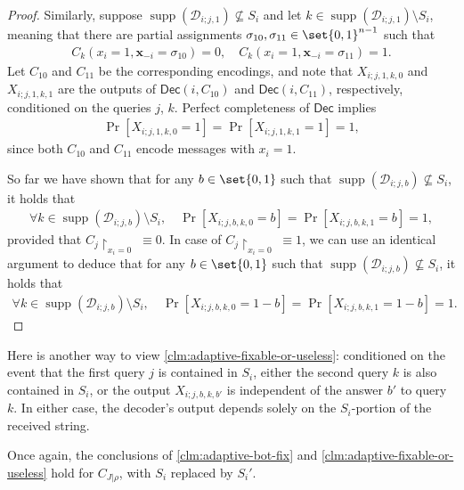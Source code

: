 \documentclass[10pt,a4paper]{article}
\theoremstyle{remark}
\def\*#1{\mathbf{#1}}
\def\+#1{\mathcal{#1}}
\newcommand{\Dec}{\ensuremath{\mathsf{Dec}}\xspace}
\providecommand{\supp}{\operatorname{supp}}
\begin{document}
\begin{proof}
Similarly, suppose $\supp(\+D_{i;j,1}) \not\subseteq S_i$ and let $k \in \supp(\+D_{i;j,1}) \setminus S_i$, meaning that there are partial assignments $\sigma_{10}, \sigma_{11} \in \set{0,1}^{n-1}$ such that
\begin{align*}
C_k(x_i=1, \*x_{-i}=\sigma_{10}) = 0, \quad C_k(x_i=1, \*x_{-i}=\sigma_{11}) = 1.
\end{align*}
Let $C_{10}$ and $C_{11}$ be the corresponding encodings, and note that $X_{i;j,1,k,0}$ and $X_{i;j,1,k,1}$ are the outputs of $\Dec(i,C_{10})$ and $\Dec(i,C_{11})$, respectively, conditioned on the queries $j$, $k$. Perfect completeness of $\Dec$ implies
\begin{align*}
\Pr[X_{i;j,1,k,0} = 1] = \Pr[X_{i;j,1,k,1} = 1] = 1,
\end{align*}
since both $C_{10}$ and $C_{11}$ encode messages with $x_i = 1$.

So far we have shown that for any $b \in \set{0,1}$ such that $\supp(\+D_{i;j,b}) \not\subseteq S_i$, it holds that
\begin{align*}
	\forall k \in \supp(\+D_{i;j,b})\setminus S_i, \quad \Pr[X_{i;j,b,k,0}=b] = \Pr[X_{i;j,b,k,1}=b] = 1,
\end{align*}
provided that $C_j \restriction_{x_i = 0} \;\equiv 0$. In case of $C_j \restriction_{x_i = 0} \;\equiv 1$, we can use an identical argument to deduce that for any $b \in \set{0,1}$ such that $\supp(\+D_{i;j,b}) \not\subseteq S_i$, it holds that
\begin{align*}
\forall k \in \supp(\+D_{i;j,b})\setminus S_i, \quad \Pr[X_{i;j,b,k,0}=1-b] = \Pr[X_{i;j,b,k,1}=1-b] = 1.
\end{align*}
\end{proof}

Here is another way to view \cref{clm:adaptive-fixable-or-useless}: conditioned on the event that the first query $j$ is contained in $S_i$, either the second query $k$ is also contained in $S_i$, or the output $X_{i;j,b,k,b'}$ is independent of the answer $b'$ to query $k$. In either case, the decoder's output depends solely on the $S_i$-portion of the received string.

Once again, the conclusions of \cref{clm:adaptive-bot-fix} and \cref{clm:adaptive-fixable-or-useless} hold for $C_{J|\rho}$, with $S_i$ replaced by $S_i'$.
\end{document}
